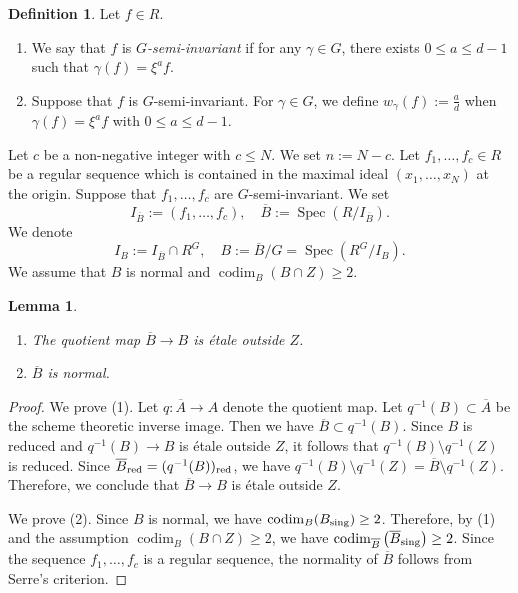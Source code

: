 \documentclass[a4paper,11pt]{amsart}
\newtheorem{lem}[thm]{Lemma}
\theoremstyle{definition}
\newtheorem{defi}[thm]{Definition}
\theoremstyle{remark}
\begin{document}
\begin{defi}\label{defi:semiinv}
Let $f\in R$.
\begin{enumerate}
\item
We say that $f$ is \textit{$G$-semi-invariant} if for any $\gamma \in G$, there exists $0 \le a \le d-1$ such that $\gamma (f) =\xi^af$.

\item
Suppose that $f$ is $G$-semi-invariant. 
For $\gamma \in G$, we define $w_{\gamma}(f):=\frac{a}{d}$ when $\gamma (f) =\xi^a f$ with $0 \le a \le d-1$.
\end{enumerate}
\end{defi}

Let $c$ be a non-negative integer with $c \le N$. 
We set $n := N - c$. 
Let $f_1,\ldots,f_c \in R$ be a regular sequence which is contained in the maximal ideal $(x_1, \ldots , x_N)$ at the origin. 
Suppose that $f_1, \ldots, f_c$ are $G$-semi-invariant.
We set 
\[
I_{\overline{B}} := \left( f_1, \ldots , f_c \right), \quad 
\overline{B} := \operatorname{Spec} \left( R/I_{\overline{B}} \right). 
\]
We denote 
\[
I_B := I_{\overline{B}} \cap R^G, \quad 
B := \overline{B}/G = \operatorname{Spec} \left( R^G/I_B \right). 
\]
We assume that $B$ is normal and $\operatorname{codim} _B (B \cap Z) \ge 2$. 
\begin{lem}\label{lem:etaleness of B}
\begin{enumerate}
\item
The quotient map $\overline{B} \to B$ is \'{e}tale outside $Z$.
\item
$\overline{B}$ is normal. 
\end{enumerate}
\end{lem}
\begin{proof}
We prove (1). Let $q:\overline{A} \to A$ denote the quotient map. 
Let $q^{-1}(B) \subset \overline{A}$ be the scheme theoretic inverse image. 
Then we have $\overline{B} \subset q^{-1}(B)$. 
Since $B$ is reduced and $q^{-1}(B) \to B$ is \'{e}tale outside $Z$, 
it follows that $q^{-1}(B) \setminus q^{-1}(Z)$ is reduced. 
Since $\overline{B} _{\rm red} = (q^{-1}(B)) _{\rm red}$, we have $q^{-1}(B) \setminus q^{-1}(Z) = \overline{B} \setminus q^{-1}(Z)$. Therefore, we conclude that $\overline{B} \to B$ is \'{e}tale outside $Z$. 

We prove (2). Since $B$ is normal, we have $\operatorname{codim} _B (B_{\rm sing}) \ge 2$. 
Therefore, by (1) and the assumption $\operatorname{codim} _B (B \cap Z) \ge 2$, we have $\operatorname{codim} _{\overline{B}} \left( \overline{B}_{\rm sing} \right) \ge 2$. 
Since the sequence $f_1, \ldots, f_c$ is a regular sequence, the normality of $\overline{B}$ follows from Serre's criterion. 
\end{proof}
\end{document}
